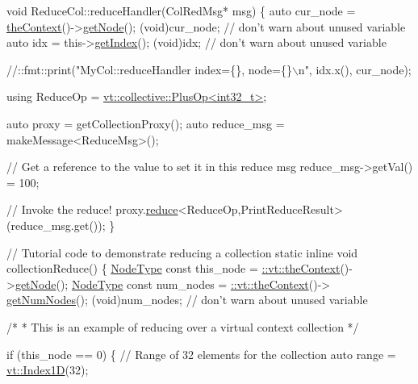 \begin{DoxyCodeInclude}
\textcolor{keywordtype}{void} ReduceCol::reduceHandler(ColRedMsg* msg) \{
  \textcolor{keyword}{auto} cur\_node = \hyperlink{namespacevt_a26551fe0e6e6a1371111df5b12c7e92c}{theContext}()->\hyperlink{structvt_1_1ctx_1_1_context_a0d52c263ce8516546a67443d9a86fa5f}{getNode}();
  (void)cur\_node;  \textcolor{comment}{// don't warn about unused variable}
  \textcolor{keyword}{auto} idx = this->\hyperlink{namespacecheckpoint_1_1dispatch_1_1typeregistry_aa75ef84e9b63a687784360ded2d56fe4}{getIndex}();
  (void)idx;  \textcolor{comment}{// don't warn about unused variable}

  \textcolor{comment}{//::fmt::print("MyCol::reduceHandler index=\{\}, node=\{\}\(\backslash\)n", idx.x(), cur\_node);}

  \textcolor{keyword}{using} ReduceOp = \hyperlink{structvt_1_1collective_1_1reduce_1_1operators_1_1_plus_op}{vt::collective::PlusOp<int32\_t>};

  \textcolor{keyword}{auto} proxy = getCollectionProxy();
  \textcolor{keyword}{auto} reduce\_msg = makeMessage<ReduceMsg>();

  \textcolor{comment}{// Get a reference to the value to set it in this reduce msg}
  reduce\_msg->getVal() = 100;

  \textcolor{comment}{// Invoke the reduce!}
  proxy.\hyperlink{structvt_1_1objgroup_1_1proxy_1_1_proxy_a61273d407174fb496b4aed10ec6650bd}{reduce}<ReduceOp,PrintReduceResult>(reduce\_msg.get());
\}

\textcolor{comment}{// Tutorial code to demonstrate reducing a collection}
\textcolor{keyword}{static} \textcolor{keyword}{inline} \textcolor{keywordtype}{void} collectionReduce() \{
  \hyperlink{namespacevt_a866da9d0efc19c0a1ce79e9e492f47e2}{NodeType} \textcolor{keyword}{const} this\_node = \hyperlink{namespacevt_a26551fe0e6e6a1371111df5b12c7e92c}{::vt::theContext}()->\hyperlink{structvt_1_1ctx_1_1_context_a0d52c263ce8516546a67443d9a86fa5f}{getNode}();
  \hyperlink{namespacevt_a866da9d0efc19c0a1ce79e9e492f47e2}{NodeType} \textcolor{keyword}{const} num\_nodes = \hyperlink{namespacevt_a26551fe0e6e6a1371111df5b12c7e92c}{::vt::theContext}()->
      \hyperlink{structvt_1_1ctx_1_1_context_a7f41071aadf6d5fa9e1b6c703c5ff19d}{getNumNodes}();
  (void)num\_nodes;  \textcolor{comment}{// don't warn about unused variable}

  \textcolor{comment}{/*}
\textcolor{comment}{   * This is an example of reducing over a virtual context collection}
\textcolor{comment}{   */}

  \textcolor{keywordflow}{if} (this\_node == 0) \{
    \textcolor{comment}{// Range of 32 elements for the collection}
    \textcolor{keyword}{auto} range = \hyperlink{namespacevt_a5540efc78234273e1796fb003fe4d234}{vt::Index1D}(32);


\end{DoxyCodeInclude}
